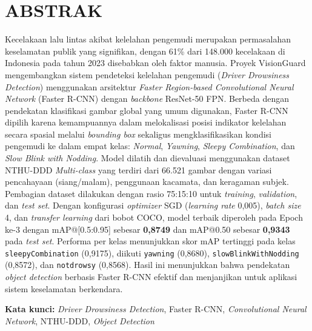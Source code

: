 \documentclass[11pt,a4paper,oneside]{report}
\begin{document}
\chapter*{ABSTRAK}

Kecelakaan lalu lintas akibat kelelahan pengemudi merupakan permasalahan keselamatan publik yang signifikan, dengan 61\% dari 148.000 kecelakaan di Indonesia pada tahun 2023 disebabkan oleh faktor manusia. Proyek VisionGuard mengembangkan sistem pendeteksi kelelahan pengemudi (\textit{Driver Drowsiness Detection}) menggunakan arsitektur \textit{Faster Region-based Convolutional Neural Network} (Faster R-CNN) dengan \textit{backbone} ResNet-50 FPN. Berbeda dengan pendekatan klasifikasi gambar global yang umum digunakan, Faster R-CNN dipilih karena kemampuannya dalam melokalisasi posisi indikator kelelahan secara spasial melalui \textit{bounding box} sekaligus mengklasifikasikan kondisi pengemudi ke dalam empat kelas: \textit{Normal}, \textit{Yawning}, \textit{Sleepy Combination}, dan \textit{Slow Blink with Nodding}. Model dilatih dan dievaluasi menggunakan dataset NTHU-DDD \textit{Multi-class} yang terdiri dari 66.521 gambar dengan variasi pencahayaan (siang/malam), penggunaan kacamata, dan keragaman subjek. Pembagian dataset dilakukan dengan rasio 75:15:10 untuk \textit{training}, \textit{validation}, dan \textit{test set}. Dengan konfigurasi \textit{optimizer} SGD (\textit{learning rate} 0,005), \textit{batch size} 4, dan \textit{transfer learning} dari bobot COCO, model terbaik diperoleh pada Epoch ke-3 dengan mAP@[0.5:0.95] sebesar \textbf{0,8749} dan mAP@0.50 sebesar \textbf{0,9343} pada \textit{test set}. Performa per kelas menunjukkan skor mAP tertinggi pada kelas \texttt{sleepyCombination} (0,9175), diikuti \texttt{yawning} (0,8680), \texttt{slowBlinkWithNodding} (0,8572), dan \texttt{notdrowsy} (0,8568). Hasil ini menunjukkan bahwa pendekatan \textit{object detection} berbasis Faster R-CNN efektif dan menjanjikan untuk aplikasi sistem keselamatan berkendara.

\vspace{1em}
\noindent\textbf{Kata kunci:} \textit{Driver Drowsiness Detection}, Faster R-CNN, \textit{Convolutional Neural Network}, NTHU-DDD, \textit{Object Detection}

\end{document}
